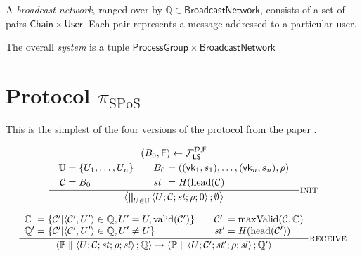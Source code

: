 \documentclass{article}
\newcommand{\sPar}{\mathrel{\parallel}}
\newcommand{\sSystem}[2]{\left\langle #1 ; #2 \right\rangle}
\newcommand{\sProcess}[4]{\left\langle U ; #1 ; #2 ; #3 ; #4 \right\rangle}
\newcommand{\sChain}{\mathcal{C}}
\newcommand{\sChains}{\mathbb{C}}
\newcommand{\sState}{\mathit{st}}
\newcommand{\sSlot}{\mathit{sl}}
\newcommand{\sLeader}{\mathsf{F}}
\newcommand{\sQueue}{\mathbb{Q}}
\newcommand{\sProcesses}{\mathbb{P}}
\DeclareMathOperator{\sMaxValid}{maxValid}
\DeclareMathOperator{\sValid}{valid}
\DeclareMathOperator{\sHead}{head}
\newcommand{\sHash}{\mathit{H}}
\begin{document}
A \emph{broadcast network}, ranged over by $\sQueue \in \mathsf{BroadcastNetwork}$, consists of a set of pairs $\mathsf{Chain} \times \mathsf{User}$.
Each pair represents a message addressed to a particular user.

The overall \emph{system} is a tuple $\mathsf{ProcessGroup} \times \mathsf{BroadcastNetwork}$

\section{Protocol $\pi_{\text{SPoS}}$}

This is the simplest of the four versions of the protocol from the paper
\cite{ouroboros}.

\bigskip

\begin{equation*}
\frac{
  \begin{array}{c}
    (B_0, \sLeader) \leftarrow \mathcal{F}_{\mathsf{LS}}^{\mathcal{D}, \sLeader}
  \\[1mm]
  \begin{array}{r@{\;}c@{\;}l@{\qquad}l@{\;}c@{\;}l}
    \mathbb{U} & = & \{U_1, \ldots, U_n\}
    &
    B_0 & = & \left( (\mathsf{vk}_1, s_1), \ldots, (\mathsf{vk}_n, s_n), \rho \right)
    \\[1mm]
    \sChain & = & B_0
    &
    \sState & = & \sHash(\sHead(\sChain)
  \end{array}
  \end{array}
}{
  \sSystem{ \bigparallel_{U \in \mathbb{U}} \sProcess{\sChain}{\sState}{\rho}{0}}{\emptyset}
} \textsc{init}
\end{equation*}

\bigskip

\begin{equation*}
\frac{
\begin{array}{l@{\;}c@{\;}l@{\qquad}l@{\;}c@{\;}l}
  \sChains & = & \left\{ \sChain' | \langle \sChain', U' \rangle \in \sQueue, U' = U, \sValid(\sChain') \right\}
  &
  \sChain' & = & \sMaxValid(\sChain, \sChains)
  \\
  \sQueue' & = & \left\{ \sChain' | \langle \sChain', U' \rangle \in \sQueue, U' \neq U \right\}
  &
  \sState' & = & \sHash(\sHead(\sChain'))
\end{array}
}{
  \sSystem{\sProcesses \sPar \sProcess{\sChain}{\sState}{\rho}{\sSlot} }{\sQueue}
\rightarrow
  \sSystem{\sProcesses \sPar \sProcess{\sChain'}{\sState'}{\rho}{\sSlot} }{\sQueue'}
} \textsc{receive}
\end{equation*}
\end{document}

